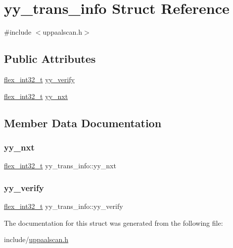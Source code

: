 \hypertarget{structyy__trans__info}{}\section{yy\+\_\+trans\+\_\+info Struct Reference}
\label{structyy__trans__info}


{\ttfamily \#include $<$uppaalscan.\+h$>$}

\subsection*{Public Attributes}
\begin{DoxyCompactItemize}
\item 
\mbox{\hyperlink{uppaalscan_8h_a838ce943cf44ef7769480714fc6c3ba9}{flex\+\_\+int32\+\_\+t}} \mbox{\hyperlink{structyy__trans__info_a5c9f61e770deef50bd4e697310342fe9}{yy\+\_\+verify}}
\item 
\mbox{\hyperlink{uppaalscan_8h_a838ce943cf44ef7769480714fc6c3ba9}{flex\+\_\+int32\+\_\+t}} \mbox{\hyperlink{structyy__trans__info_ae0715250c2bef261e596e77e0030f13e}{yy\+\_\+nxt}}
\end{DoxyCompactItemize}


\subsection{Member Data Documentation}
\mbox{\label{structyy__trans__info_ae0715250c2bef261e596e77e0030f13e}} 
\subsubsection{\texorpdfstring{yy\_nxt}{yy\_nxt}}
{\footnotesize\ttfamily \mbox{\hyperlink{uppaalscan_8h_a838ce943cf44ef7769480714fc6c3ba9}{flex\+\_\+int32\+\_\+t}} yy\+\_\+trans\+\_\+info\+::yy\+\_\+nxt}

\mbox{\label{structyy__trans__info_a5c9f61e770deef50bd4e697310342fe9}} 
\subsubsection{\texorpdfstring{yy\_verify}{yy\_verify}}
{\footnotesize\ttfamily \mbox{\hyperlink{uppaalscan_8h_a838ce943cf44ef7769480714fc6c3ba9}{flex\+\_\+int32\+\_\+t}} yy\+\_\+trans\+\_\+info\+::yy\+\_\+verify}



The documentation for this struct was generated from the following file\+:\begin{DoxyCompactItemize}
\item 
include/\mbox{\hyperlink{uppaalscan_8h}{uppaalscan.\+h}}\end{DoxyCompactItemize}
